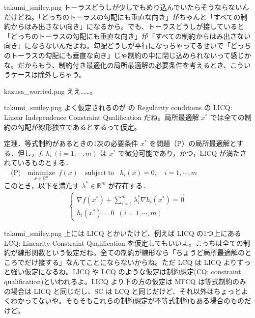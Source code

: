 \documentclass[b5paper,xelatex,ja=standard,10pt]{bxjsarticle}
\begin{document}
\begin{SERIFU}[colback=PaleGold, colbacktitle=PaleGold2]{takumi_smiley.png}
トーラスどうしが少しでもめり込んでいたらそうならないんだけどね。「どっちのトーラスの勾配にも垂直な向き」がちゃんと「すべての制約からはみ出さない向き」になるから。でも、トーラスどうしが接していると「どっちのトーラスの勾配にも垂直な向き」が「すべての制約からはみ出さない向き」にならないんだよね。勾配どうしが平行になっちゃってるせいで「どっちのトーラスの勾配にも垂直な向き」じゃ制約の中に閉じ込められないって感じかな。だからもう、制約付き最適化の局所最適解の必要条件を考えるとき、こういうケースは除外しちゃう。
\end{SERIFU}

\begin{SERIFU}[colback=PaleIris, colbacktitle=PaleIris2]{kazusa_worried.png}
ええ……。
\end{SERIFU}

\begin{SERIFU}[colback=PaleGold, colbacktitle=PaleGold2]{takumi_smiley.png}
よく仮定されるのが \cite{wikipedia_en} の Regularity conditions の LICQ: Linear Independence Constraint Qualification だね。局所最適解 $x^\ast$ では全ての制約の勾配が線形独立であるとするって仮定。
\end{SERIFU}

\begin{PROP}[colback=White]{定理．等式制約があるときの1次の必要条件}
$x^\ast$ を問題（P）の局所最適解とする．但し，$f, \, h_i \, (i = 1, \cdots, m)$ は $x^\ast$ で微分可能であり，かつ，LICQ が満たされているものとする．
\\[5pt]
　(P)　$\displaystyle \underset{x \in \mathbb{R}^n}{\mathrm{minimize}} \; \; f(x) \quad  \mathrm{subject \; to}   \; \; \; h_i(x) = 0,  \quad i = 1, \cdots, m$
\\[5pt]
このとき，以下を満たす $\lambda^\ast \in \mathbb{R}^m$ が存在する．
\begin{eqnarray*}
\left\{
\begin{array}{l}
\displaystyle \nabla f (x^\ast) + \sum_{i=1}^m \lambda^\ast_i \nabla h_i (x^\ast) = \vec{0}
\\[5pt]
h_i(x^\ast) = 0 \; \; (i = 1, \cdots, m)
\end{array}
\right.
\end{eqnarray*}
\end{PROP}

\begin{SERIFU}[colback=PaleGold, colbacktitle=PaleGold2]{takumi_smiley.png}
上には LICQ とかいたけど、例えば LICQ の1つ上にある LCQ: Linearity Constraint Qualification を仮定してもいいよ。こっちは全ての制約が線形関数という仮定だね。全ての制約が線形なら「ちょうど局所最適解のところでだけ接する」なんてことにならないからね。ただ LCQ は LICQ よりずっと強い仮定になるね。LICQ や LCQ のような仮定は制約想定(CQ: constraint qualification)といわれるよ。LICQ より下の方の仮定は MFCQ は等式制約のみの場合は LICQ と同じだし、SC は LCQ と同じだけど、それ以外はちょっとよくわかってないや。そもそもこれらの制約想定が不等式制約もある場合のものだけど。
\end{SERIFU}
\end{document}

